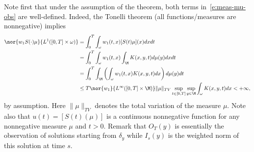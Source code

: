 Note first that under the assumption of the theorem, both terms in~\eqref{e:meas-mu-obs} are well-defined. Indeed, the Tonelli theorem (all functions/measures are nonnegative) implies
\begin{align*}
\nor{w_1 S(\cdot)\mu}{L^1([0,T]\times \omega)} & = \int_0^T \int_\omega w_1(t,x) [S(t)\mu](x) dx dt \\
& = \int_0^T \int_\omega w_1(t,x) \int_{\M} K(x,y,t)d\mu(y) dx dt \\
& = \int_0^T \int_{\M} \left(\int_\omega w_1(t, x) K(x,y,t)dx \right)d\mu(y) dt \\
& \leq T \nor{w_1}{L^\infty([0,T]\times \M)} \|\mu\|_{TV} \sup_{t\in [0,T]} \sup_{y\in \M} \int_\omega K(x,y,t)dx
< + \infty,
\end{align*}
by assumption. Here $\|\mu\|_{TV}$ denotes the total variation of the measure $\mu$.
Note also that $u(t) = [S(t)(\mu)]$ is a continuous nonnegative function for any nonnegative measure $\mu$ and $t>0$.
Remark that $O_T(y)$ is essentially the observation of solutions starting from $\delta_y$ while $I_s(y)$ is the weighted norm of this solution at time $s$.

